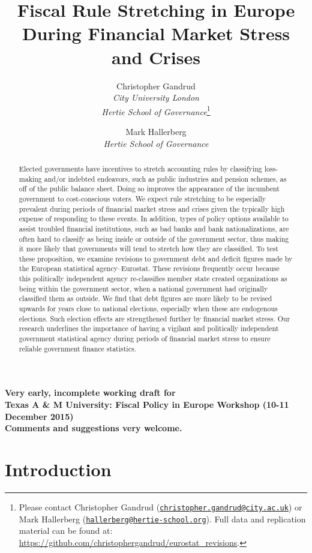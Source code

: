 \documentclass[]{article}
\title{Fiscal Rule Stretching in Europe During Financial Market Stress and Crises}
\author{Christopher Gandrud \\ \emph{City University London} \\ \emph{Hertie School of Governance}\footnote{Please contact Christopher Gandrud
(\href{mailto:christopher.gandrud@city.ac.uk}{\nolinkurl{christopher.gandrud@city.ac.uk}}) or Mark Hallerberg (\href{mailto:hallerberg@hertie-school.org}{\nolinkurl{hallerberg@hertie-school.org}}). Full data and replication material can be found at: \url{https://github.com/christophergandrud/eurostat_revisions}.}
\and
Mark Hallerberg \\ \emph{Hertie School of Governance}}
\begin{document}
\maketitle

\begin{center}
    \textbf{Very early, incomplete working draft for\\ Texas A \& M University: Fiscal Policy in Europe Workshop (10-11 December 2015) \\
    Comments and suggestions very welcome.}
\end{center}

\begin{abstract}
    Elected governments have incentives to stretch accounting rules by classifying loss-making and/or indebted endeavors, such as public industries and pension schemes, as off of the public balance sheet. Doing so improves the appearance of the incumbent government to cost-conscious voters. We expect rule stretching to be especially prevalent during periods of financial market stress and crises given the typically high expense of responding to these events. In addition, types of policy options available to assist troubled financial institutions, such as bad banks and bank nationalizations, are often hard to classify as being inside or outside of the government sector, thus making it more likely that governments will tend to stretch how they are classified. To test these proposition, we examine revisions to government debt and deficit figures made by the European statistical agency--Eurostat. These revisions frequently occur because this politically independent agency re-classifies member state created organizations as being within the government sector, when a national government had originally classified them as outside. We find that debt figures are more likely to be revised upwards for years close to national elections, especially when these are endogenous elections. Such election effects are strengthened further by financial market stress. Our research underlines the importance of having a vigilant and politically independent government statistical agency during periods of financial market stress to ensure reliable government finance statistics.
\end{abstract}

\section{Introduction}
\end{document}
